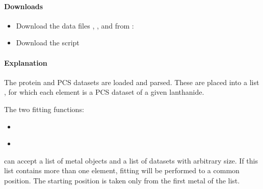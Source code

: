 \documentclass[a4paper,10pt,english,openany,oneside]{sphinxmanual}
\begin{document}
\paragraph{Downloads}
\label{\detokenize{examples/pcs_fit_multiple:downloads}}\begin{itemize}
\item {} 
\sphinxAtStartPar
Download the data files , ,  and  from :

\item {} 
\sphinxAtStartPar
Download the script 

\end{itemize}


\paragraph{Explanation}
\label{\detokenize{examples/pcs_fit_multiple:explanation}}
\sphinxAtStartPar
The protein and PCS datasets are loaded and parsed. These are placed into a list , for which each element is a PCS dataset of a given lanthanide.

\sphinxAtStartPar
The two fitting functions:
\begin{itemize}
\item {} 
\sphinxAtStartPar
{\hyperref[\detokenize{reference/generated/paramagpy.fit.svd_gridsearch_fit_metal_from_pcs:paramagpy.fit.svd_gridsearch_fit_metal_from_pcs}]{}}

\item {} 
\sphinxAtStartPar
{\hyperref[\detokenize{reference/generated/paramagpy.fit.nlr_fit_metal_from_pcs:paramagpy.fit.nlr_fit_metal_from_pcs}]{}}

\end{itemize}

\sphinxAtStartPar
can accept a list of metal objects and a list of datasets with arbitrary size. If this list contains more than one element, fitting will be performed to a common position. The starting position is taken only from the first metal of the list.
\end{document}
